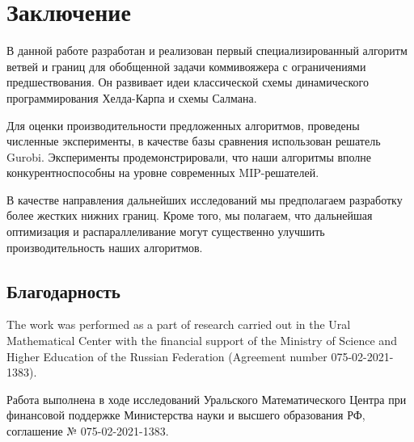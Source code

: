 \section{Заключение}\label{sec:summary}

В данной работе
разработан и реализован
первый специализированный алгоритм
ветвей и границ
для обобщенной задачи коммивояжера
с ограничениями предшествования.
Он развивает идеи классической схемы
динамического программирования
Хелда-Карпа
и схемы Салмана.

Для оценки производительности
предложенных алгоритмов,
проведены численные эксперименты,
в качестве базы сравнения использован
решатель Gurobi.
Эксперименты продемонстрировали,
что наши алгоритмы 
вполне конкурентноспособны на уровне
современных MIP-решателей.

В качестве направления дальнейших исследований
мы предполагаем разработку более 
жестких нижних границ.
Кроме того,
мы полагаем,
что дальнейшая оптимизация
и распараллеливание
могут существенно улучшить производительность
наших алгоритмов.

\subsection*{Благодарность}
The work was performed as a part of research carried out
in the Ural Mathematical Center with the financial support
of the Ministry of Science and Higher Education of the Russian Federation
(Agreement number 075-02-2021-1383).

Работа выполнена
в ходе исследований
Уральского Математического Центра
при финансовой поддержке Министерства науки и высшего образования РФ, 
соглашение № 075-02-2021-1383.
